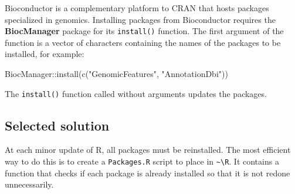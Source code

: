 \documentclass[
  12pt,
  american,
  a4paper,
  extrafontsizes,onecolumn,openright
  ]{memoir}
\newenvironment{Shaded}{\begin{snugshade}}{\end{snugshade}}
\newcommand{\FunctionTok}[1]{\textcolor[rgb]{0.00,0.00,0.00}{#1}}
\newcommand{\NormalTok}[1]{#1}
\newcommand{\SpecialCharTok}[1]{\textcolor[rgb]{0.00,0.00,0.00}{#1}}
\newcommand{\StringTok}[1]{\textcolor[rgb]{0.31,0.60,0.02}{#1}}
\begin{document}
Bioconductor is a complementary platform to CRAN that hosts packages specialized in genomics.
Installing packages from Bioconductor requires the \textbf{BiocManager} package for its \texttt{install()} function.
The first argument of the function is a vector of characters containing the names of the packages to be installed, for example:

\scriptsize

\begin{Shaded}
\begin{Highlighting}[]
\NormalTok{BiocManager}\SpecialCharTok{::}\FunctionTok{install}\NormalTok{(}\FunctionTok{c}\NormalTok{(}\StringTok{"GenomicFeatures"}\NormalTok{, }\StringTok{"AnnotationDbi"}\NormalTok{))}
\end{Highlighting}
\end{Shaded}

\normalsize

The \texttt{install()} function called without arguments updates the packages.

\hypertarget{selected-solution}{%
\subsection{Selected solution}\label{selected-solution}}

At each minor update of R, all packages must be reinstalled.
The most efficient way to do this is to create a \texttt{Packages.R} script to place in \texttt{\textasciitilde{}\textbackslash{}R}.
It contains a function that checks if each package is already installed so that it is not redone unnecessarily.

\scriptsize
\end{document}

